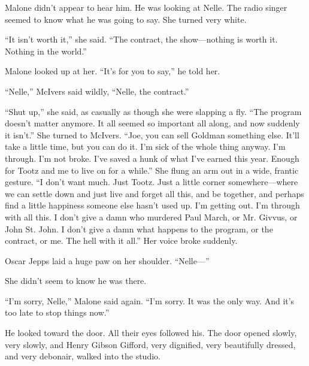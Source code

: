\documentclass{novel}
\begin{document}
\vspace{2\nbs}
\clearpage
\thispagestyle{empty}

\begin{ChapterStart}
\vspace{3\nbs}
\end{ChapterStart}

Malone didn’t appear to hear him. He was looking at Nelle. The radio singer seemed to know what he was going to say. She turned very white.

“It isn’t worth it,” she said. “The contract, the show—nothing is worth it. Nothing in the world.”

Malone looked up at her. “It’s for you to say,” he told her.

“Nelle,” McIvers said wildly, “Nelle, the contract.”

“Shut up,” she said, as casually as though she were slapping a fly. “The program doesn’t matter anymore. It all seemed so important all along, and now suddenly it isn’t.” She turned to McIvers. “Joe, you can sell Goldman something else. It’ll take a little time, but you can do it. I'm sick of the whole thing anyway. I’m through. I’m not broke. I've saved a hunk of what I’ve earned this year. Enough for Tootz and me to live on for a while.” She flung an arm out in a wide, frantic gesture. “I don’t want much. Just Tootz. Just a little corner somewhere—where we can settle down and just live and forget all this, and be together, and perhaps find a little happiness someone else hasn’t used up. I’m getting out. I’m through with all this. I don’t give a damn who murdered Paul March, or Mr. Givvus, or John St. John. I don’t give a damn what happens to the program, or the contract, or me. The hell with it all.” Her voice broke suddenly.

Oscar Jepps laid a huge paw on her shoulder. “Nelle—”

She didn’t seem to know he was there.

“I’m sorry, Nelle,” Malone said again. “I’m sorry. It was the only way. And it’s too late to stop things now.”

He looked toward the door. All their eyes followed his. The door opened slowly, very slowly, and Henry Gibson Gifford, very dignified, very beautifully dressed, and very debonair, walked into the studio.
\end{document}
